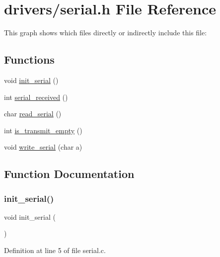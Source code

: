 \hypertarget{a00053}{}\section{drivers/serial.h File Reference}
\label{a00053}
This graph shows which files directly or indirectly include this file\+:
\subsection*{Functions}
\begin{DoxyCompactItemize}
\item 
void \hyperlink{a00053_acfb6f6d615183fc2f71e79dfbadfe27d_acfb6f6d615183fc2f71e79dfbadfe27d}{init\+\_\+serial} ()
\item 
int \hyperlink{a00053_af10f0e64ba89e8635aa7245ca08297c5_af10f0e64ba89e8635aa7245ca08297c5}{serial\+\_\+received} ()
\item 
char \hyperlink{a00053_ad343a7018f74662f794968dfa0523841_ad343a7018f74662f794968dfa0523841}{read\+\_\+serial} ()
\item 
int \hyperlink{a00053_a01fe5504f7b8f4eee1545737495bae76_a01fe5504f7b8f4eee1545737495bae76}{is\+\_\+transmit\+\_\+empty} ()
\item 
void \hyperlink{a00053_aac3c84e21fffc4696d8969ca6955bfc8_aac3c84e21fffc4696d8969ca6955bfc8}{write\+\_\+serial} (char a)
\end{DoxyCompactItemize}


\subsection{Function Documentation}
\mbox{\label{a00053_acfb6f6d615183fc2f71e79dfbadfe27d_acfb6f6d615183fc2f71e79dfbadfe27d}} 
\subsubsection{\texorpdfstring{init\+\_\+serial()}{init\_serial()}}
{\footnotesize\ttfamily void init\+\_\+serial (\begin{DoxyParamCaption}{ }\end{DoxyParamCaption})}



Definition at line 5 of file serial.\+c.


